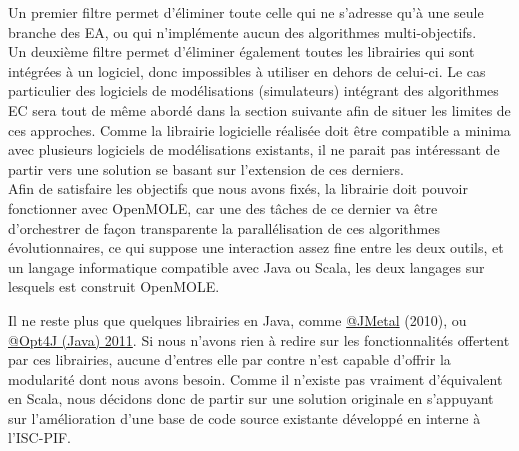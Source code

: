 Un premier filtre permet d'éliminer toute celle qui ne s'adresse qu'à une seule branche des EA, ou qui n'implémente aucun des algorithmes multi-objectifs.
\\
Un deuxième filtre permet d'éliminer également toutes les librairies qui sont intégrées à un logiciel, donc impossibles à utiliser en dehors de celui-ci. Le cas particulier des logiciels de modélisations (simulateurs) intégrant des algorithmes EC sera tout de même abordé dans la section suivante afin de situer les limites de ces approches. Comme la librairie logicielle réalisée doit être compatible a minima avec plusieurs logiciels de modélisations existants, il ne parait pas intéressant de partir vers une solution se basant sur l'extension de ces derniers.
\\
Afin de satisfaire les objectifs que nous avons fixés, la librairie doit pouvoir fonctionner avec OpenMOLE, car une des tâches de ce dernier va être d'orchestrer de façon transparente la parallélisation de ces algorithmes évolutionnaires, ce qui suppose une interaction assez fine entre les deux outils, et un langage informatique compatible avec Java ou Scala, les deux langages sur lesquels est construit OpenMOLE.

Il ne reste plus que quelques librairies en Java, comme \href{http://jmetal.sourceforge.net/}{@JMetal} (2010), ou \href{http://opt4j.sourceforge.net/}{@Opt4J (Java) 2011}. Si nous n'avons rien à redire sur les fonctionnalités offertent par ces librairies, aucune d'entres elle par contre n'est capable d'offrir la modularité dont nous avons besoin. Comme il n'existe pas vraiment d'équivalent en Scala, nous décidons donc de partir sur une solution originale en s'appuyant sur l'amélioration d'une base de code source existante développé en interne à l'ISC-PIF.







